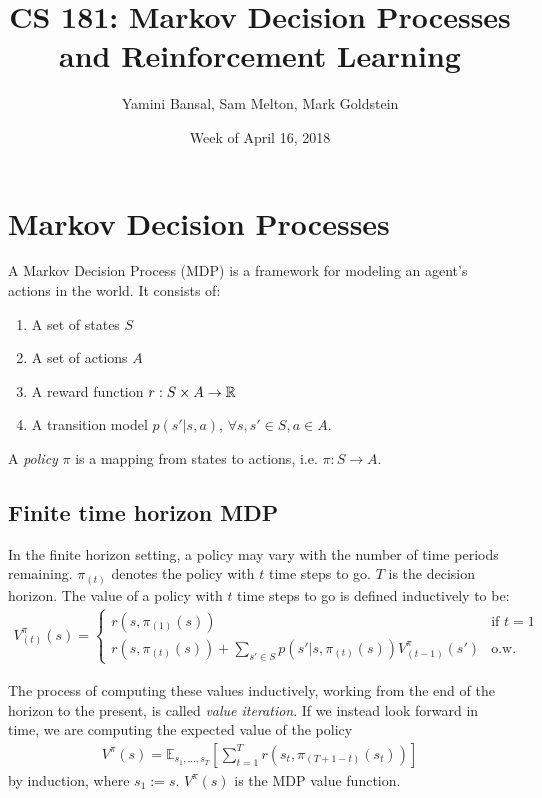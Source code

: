 \documentclass[12pt]{article}
\begin{document}
\title{CS 181: Markov Decision Processes and Reinforcement Learning}
\author{Yamini Bansal, Sam Melton, Mark Goldstein}
\date{Week of April 16, 2018}
\maketitle

\section{Markov Decision Processes}

A Markov Decision Process (MDP) is a framework for modeling an
agent's actions in the world. It consists of:
\begin{enumerate}
\item A set of states $S$
\item A set of actions $A$
\item A reward function $r: S \times A \rightarrow \mathbb{R}$
\item A transition model $p(s'| s, a)$, $\forall s,s' \in S, a \in A$.
\end{enumerate}
A \textit{policy} $\pi$ is a mapping from states to actions, i.e. $\pi: S \to A$. 

\subsection{Finite time horizon MDP}

In the finite horizon setting, a policy may vary with the number
of time periods remaining. $\pi_{(t)}$ denotes the
policy with $t$ time steps
to go. $T$ is the decision horizon. The value of a policy
with $t$ time steps to go
 is defined inductively
to be:
\begin{align} 
V^\pi_{(t)}(s) = \begin{cases}
r(s, \pi_{(1)}(s))
 & \text{if } t = 1 \\ 
r(s, \pi_{(t)}(s)) + \sum_{s' \in S} p(s' | s, \pi_{(t)}(s)) V^\pi_{(t-1)}(s') & \text{o.w.}\end{cases}
\end{align}

The process of computing these values inductively,
working from the end of the horizon to the present, 
is called
\textit{value iteration}.  
If we instead look forward in time, we
 are  computing the expected
value of the policy
%
%
\begin{align} V^\pi(s) = \mathbb{E}_{s_1,\ldots,s_T}\left[\sum_{t=1}^T r(s_t, \pi_{(T+1-t)}(s_t))\right] \end{align}
by induction, where $s_1 := s$. $V^\pi(s)$ is the MDP value function.
\end{document}
